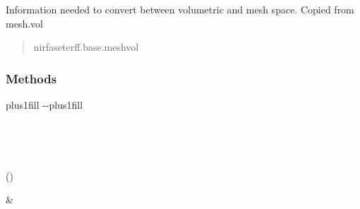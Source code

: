 \documentclass[letterpaper,10pt,english]{sphinxmanual}
\begin{document}
\begin{fulllineitems}
\begin{fulllineitems}
\label{\detokenize{_autosummary/nirfasterff.base.data.DCSdata:nirfasterff.base.data.DCSdata.vol}}
\pysigstartsignatures
\pysigline
{}
\pysigstopsignatures
\sphinxAtStartPar
Information needed to convert between volumetric and mesh space. Copied from mesh.vol
\begin{quote}\begin{description}
\sphinxAtStartPar
nirfaseterff.base.meshvol

\end{description}\end{quote}

\end{fulllineitems}


\begin{fulllineitems}
\label{\detokenize{_autosummary/nirfasterff.base.data.DCSdata:nirfasterff.base.data.DCSdata.__init__}}
\pysigstartsignatures
\pysiglinewithargsret
{}
{}
{}
\pysigstopsignatures
\end{fulllineitems}

\subsubsection*{Methods}


\begin{savenotes}
\sphinxatlongtablestart
\sphinxthistablewithglobalstyle
\sphinxthistablewithnovlinesstyle
\makeatletter
  \LTleft \@totalleftmargin plus1fill
  \LTright\dimexpr\columnwidth-\@totalleftmargin-\linewidth\relax plus1fill
\makeatother
\begin{longtable}{}
\sphinxtoprule
\endfirsthead

\\
\sphinxtoprule
\endhead

\sphinxbottomrule
{}\\
\endfoot

\endlastfoot
\sphinxtableatstartofbodyhook
\begin{varwidth}[t]{}
\sphinxAtStartPar
{\hyperref[\detokenize{_autosummary/nirfasterff.base.data.DCSdata:nirfasterff.base.data.DCSdata.__init__}]{}}()
\sphinxbeforeendvarwidth
\end{varwidth}%
&\begin{varwidth}[t]{}
\sphinxAtStartPar


\end{varwidth}
\end{longtable}
\end{savenotes}
\end{fulllineitems}
\end{document}
